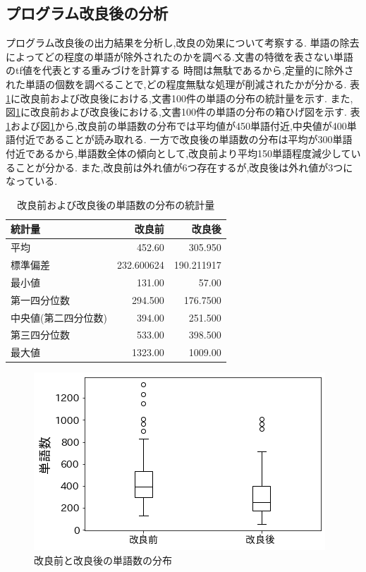 \documentclass[a4j]{jarticle}
\begin{document}
\subsection{プログラム改良後の分析}
プログラム改良後の出力結果を分析し,改良の効果について考察する.
単語の除去によってどの程度の単語が除外されたのかを調べる.文書の特徴を表さない単語のtf値を代表とする重みづけを計算する
時間は無駄であるから,定量的に除外された単語の個数を調べることで,どの程度無駄な処理が削減されたかが分かる.
表\ref{describe-word}に改良前および改良後における,文書100件の単語の分布の統計量を示す.
また,図\ref{boxplot}に改良前および改良後における,文書100件の単語の分布の箱ひげ図を示す.
表\ref{describe-word}および図\ref{boxplot}から,改良前の単語数の分布では平均値が450単語付近,中央値が400単語付近であることが読み取れる.
一方で改良後の単語数の分布は平均が300単語付近であるから,単語数全体の傾向として,改良前より平均150単語程度減少していることが分かる.
また,改良前は外れ値が6つ存在するが,改良後は外れ値が3つになっている.

\begin{table}[H]
	\caption{改良前および改良後の単語数の分布の統計量}
	\label{describe-word}
	\begin{center}
		\begin{tabular}{l|r r}\hline
			統計量 & 改良前 & 改良後 \\ \hline
			\hline	
			平均 & 452.60 & 305.950	\\
			標準偏差 & 232.600624 & 190.211917	\\
			最小値 & 131.00	& 57.00	\\
			第一四分位数 & 294.500 & 176.7500	\\
			中央値(第二四分位数) & 394.00 & 251.500	\\
			第三四分位数 & 533.00 & 398.500	\\
			最大値 & 1323.00 & 1009.00	\\ \hline
 		\end{tabular}
	\end{center}
	\end{table}

\begin{figure}[H]
	\centering
	\includegraphics[scale=0.75]{boxplot.png}
	\caption{改良前と改良後の単語数の分布}
   \label{boxplot}
  \end{figure}
\end{document}
